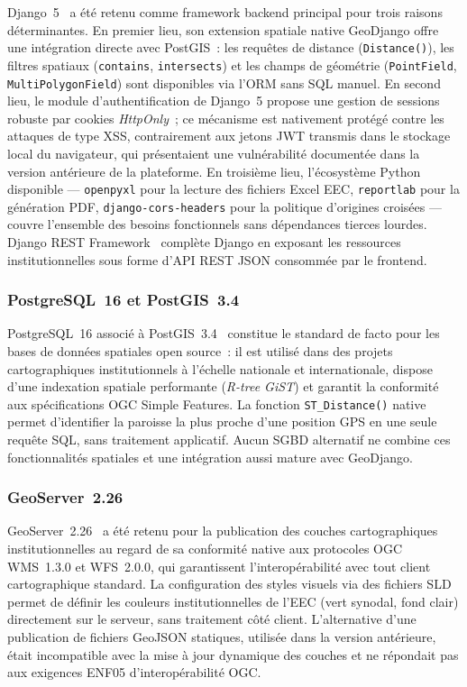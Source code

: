 Django~5~\cite{django2024} a été retenu comme framework backend principal
pour trois raisons déterminantes. En premier lieu, son extension spatiale
native GeoDjango offre une intégration directe avec PostGIS~: les requêtes
de distance (\texttt{Distance()}), les filtres spatiaux (\texttt{contains},
\texttt{intersects}) et les champs de géométrie (\texttt{PointField},
\texttt{MultiPolygonField}) sont disponibles via l'ORM sans SQL manuel.
En second lieu, le module d'authentification de Django~5 propose une gestion
de sessions robuste par cookies \textit{HttpOnly}~; ce mécanisme est
nativement protégé contre les attaques de type XSS, contrairement aux
jetons JWT transmis dans le stockage local du navigateur, qui présentaient
une vulnérabilité documentée dans la version antérieure de la plateforme.
En troisième lieu, l'écosystème Python disponible ---
\texttt{openpyxl} pour la lecture des fichiers Excel EEC,
\texttt{reportlab} pour la génération PDF, \texttt{django-cors-headers}
pour la politique d'origines croisées --- couvre l'ensemble des besoins
fonctionnels sans dépendances tierces lourdes. Django REST
Framework~\cite{drf2024} complète Django en exposant les ressources
institutionnelles sous forme d'API REST JSON consommée par le frontend.

\subsubsection{PostgreSQL~16 et PostGIS~3.4}

PostgreSQL~16 associé à PostGIS~3.4~\cite{postgis2023} constitue le
standard de facto pour les bases de données spatiales open source~: il est
utilisé dans des projets cartographiques institutionnels à l'échelle nationale
et internationale, dispose d'une indexation spatiale performante
(\textit{R-tree GiST}) et garantit la conformité aux spécifications OGC
Simple Features. La fonction \texttt{ST\_Distance()} native permet
d'identifier la paroisse la plus proche d'une position GPS en une seule
requête SQL, sans traitement applicatif. Aucun SGBD alternatif ne combine
ces fonctionnalités spatiales et une intégration aussi mature avec GeoDjango.

\subsubsection{GeoServer~2.26}

GeoServer~2.26~\cite{geoserver2024} a été retenu pour la publication des
couches cartographiques institutionnelles au regard de sa conformité native
aux protocoles OGC WMS~1.3.0 et WFS~2.0.0, qui garantissent
l'interopérabilité avec tout client cartographique standard. La
configuration des styles visuels via des fichiers SLD permet de définir les
couleurs institutionnelles de l'EEC (vert synodal, fond clair) directement
sur le serveur, sans traitement côté client. L'alternative d'une
publication de fichiers GeoJSON statiques, utilisée dans la version
antérieure, était incompatible avec la mise à jour dynamique des couches
et ne répondait pas aux exigences ENF05 d'interopérabilité OGC.

